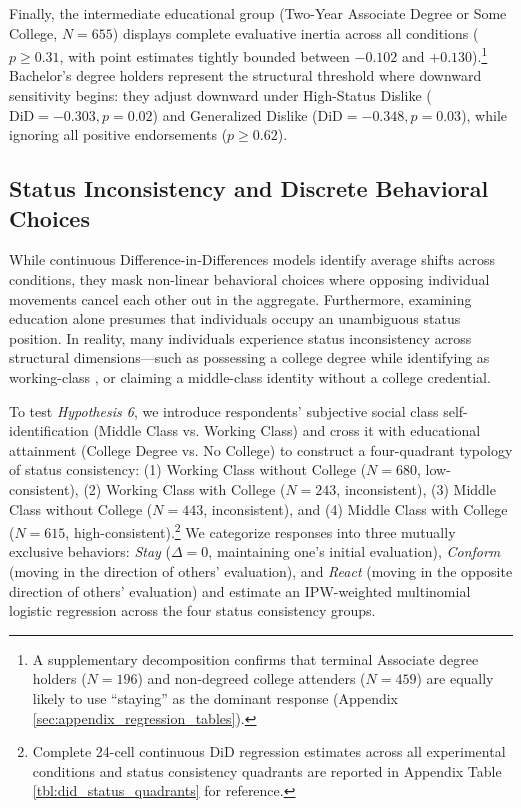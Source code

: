\documentclass[12pt, letterpaper]{article}
\begin{document}
Finally, the intermediate educational group (Two-Year Associate Degree or Some College, $N = 655$) displays complete evaluative inertia across all conditions ($p \ge 0.31$, with point estimates tightly bounded between $-0.102$ and $+0.130$).\footnote{A supplementary decomposition confirms that terminal Associate degree holders ($N = 196$) and non-degreed college attenders ($N = 459$) are equally likely to use ``staying'' as the dominant response (Appendix \ref{sec:appendix_regression_tables}).} Bachelor's degree holders represent the structural threshold where downward sensitivity begins: they adjust downward under High-Status Dislike ($\text{DiD} = -0.303, p = 0.02$) and Generalized Dislike ($\text{DiD} = -0.348, p = 0.03$), while ignoring all positive endorsements ($p \ge 0.62$). 

\subsection{Status Inconsistency and Discrete Behavioral Choices}
\label{sec:behavioral_models}
While continuous Difference-in-Differences models identify average shifts across conditions, they mask non-linear behavioral choices where opposing individual movements cancel each other out in the aggregate. Furthermore, examining education alone presumes that individuals occupy an unambiguous status position. In reality, many individuals experience status inconsistency across structural dimensions—such as possessing a college degree while identifying as working-class \citep{friedman2021deflecting-8bf}, or claiming a middle-class identity without a college credential. 

To test \textit{Hypothesis 6}, we introduce respondents' subjective social class self-identification (Middle Class vs. Working Class) and cross it with educational attainment (College Degree vs. No College) to construct a four-quadrant typology of status consistency: (1) Working Class without College ($N = 680$, low-consistent), (2) Working Class with College ($N = 243$, inconsistent), (3) Middle Class without College ($N = 443$, inconsistent), and (4) Middle Class with College ($N = 615$, high-consistent).\footnote{Complete 24-cell continuous DiD regression estimates across all experimental conditions and status consistency quadrants are reported in Appendix Table \ref{tbl:did_status_quadrants} for reference.} We categorize responses into three mutually exclusive behaviors: \textit{Stay} ($\Delta = 0$, maintaining one's initial evaluation), \textit{Conform} (moving in the direction of others' evaluation), and \textit{React} (moving in the opposite direction of others' evaluation) and estimate an IPW-weighted multinomial logistic regression across the four status consistency groups.
\end{document}
